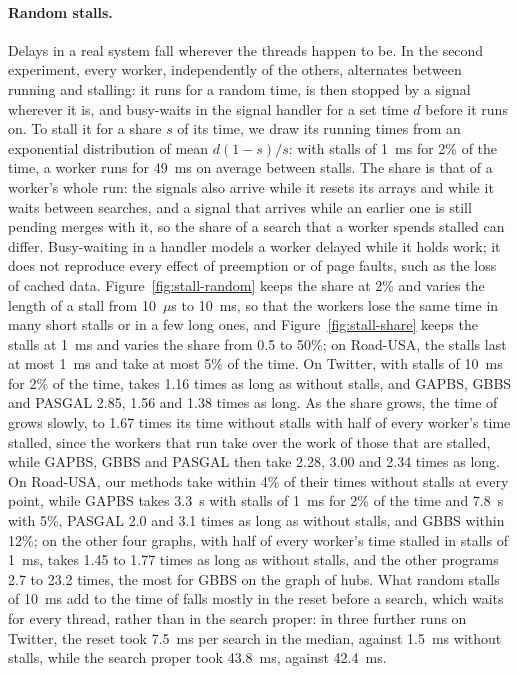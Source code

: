 \paragraph{Random stalls.} Delays in a real system fall wherever the threads happen to be. In the second experiment, every worker, independently of the others, alternates between running and stalling: it runs for a random time, is then stopped by a signal wherever it is, and busy-waits in the signal handler for a set time $d$ before it runs on. To stall it for a share $s$ of its time, we draw its running times from an exponential distribution of mean $d(1-s)/s$: with stalls of 1~ms for 2\% of the time, a worker runs for 49~ms on average between stalls. The share is that of a worker's whole run: the signals also arrive while it resets its arrays and while it waits between searches, and a signal that arrives while an earlier one is still pending merges with it, so the share of a search that a worker spends stalled can differ. Busy-waiting in a handler models a worker delayed while it holds work; it does not reproduce every effect of preemption or of page faults, such as the loss of cached data. Figure~\ref{fig:stall-random} keeps the share at 2\% and varies the length of a stall from 10~$\mu$s to 10~ms, so that the workers lose the same time in many short stalls or in a few long ones, and Figure~\ref{fig:stall-share} keeps the stalls at 1~ms and varies the share from 0.5 to 50\%; on Road-USA, the stalls last at most 1~ms and take at most 5\% of the time. On Twitter, with stalls of 10~ms for 2\% of the time, \wfdo takes 1.16 times as long as without stalls, and GAPBS, GBBS and PASGAL 2.85, 1.56 and 1.38 times as long. As the share grows, the time of \wfdo grows slowly, to 1.67 times its time without stalls with half of every worker's time stalled, since the workers that run take over the work of those that are stalled, while GAPBS, GBBS and PASGAL then take 2.28, 3.00 and 2.34 times as long. On Road-USA, our methods take within 4\% of their times without stalls at every point, while GAPBS takes 3.3~s with stalls of 1~ms for 2\% of the time and 7.8~s with 5\%, PASGAL 2.0 and 3.1 times as long as without stalls, and GBBS within 12\%; on the other four graphs, with half of every worker's time stalled in stalls of 1~ms, \wfdo takes 1.45 to 1.77 times as long as without stalls, and the other programs 2.7 to 23.2 times, the most for GBBS on the graph of hubs. What random stalls of 10~ms add to the time of \wfdo falls mostly in the reset before a search, which waits for every thread, rather than in the search proper: in three further runs on Twitter, the reset took 7.5~ms per search in the median, against 1.5~ms without stalls, while the search proper took 43.8~ms, against 42.4~ms.

